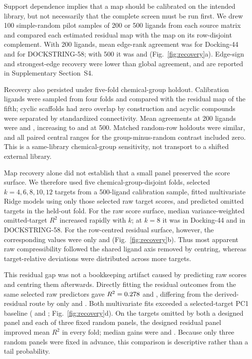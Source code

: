 \documentclass[11pt]{article}
\begin{document}
Support dependence implies that a map should be calibrated on the intended
library, but not necessarily that the complete screen must be run first. We drew
100 simple-random pilot samples of 200 or 500 ligands from each source matrix and
compared each estimated residual map with the map on its row-disjoint complement.
With 200 ligands, mean edge-rank agreement was \DffProbeTwoHundred{} for
Docking-44 and \DsProbeTwoHundred{} for DOCKSTRING-58; with 500 it was
\DffProbeFiveHundred{} and \DsProbeFiveHundred{}
(Fig.~\ref{fig:recovery}a). Edge-sign and strongest-edge recovery were lower
than global agreement, and are reported in Supplementary Section~S4.

Recovery also persisted under five-fold chemical-group holdout. Calibration
ligands were sampled from four folds and compared with the residual map of the
fifth; cyclic scaffolds had zero overlap by construction and acyclic compounds
were separated by standardized connectivity. Mean agreements at 200 ligands
were \DffScaffoldProbeTwoHundred{} and \DsScaffoldProbeTwoHundred{}, increasing
to \DffScaffoldProbeFiveHundred{} and \DsScaffoldProbeFiveHundred{} at 500.
Matched random-row holdouts were similar, and all paired central ranges for the
group-minus-random contrast included zero. This is a same-library
chemical-group sensitivity, not transport to a shifted external library.

Map recovery alone did not establish that a small panel preserved the score
surface. We therefore used five chemical-group-disjoint folds, selected
$k=4,6,8,10,12$ targets from a 500-ligand calibration sample, fitted
multivariate Ridge models using only those selected raw target scores, and
predicted omitted targets in the held-out fold. For the raw score surface,
median variance-weighted omitted-target $R^2$ increased rapidly with $k$; at
$k=8$ it was \DffSelectorRawRtwo{} in Docking-44 and \DsSelectorRawRtwo{} in
DOCKSTRING-58. For the row-centred residual surface, however, the corresponding
values were only \DffSelectorResidualRtwo{} and
\DsSelectorResidualRtwo{} (Fig.~\ref{fig:recovery}b). Thus most apparent raw
compressibility followed the shared ligand axis removed by centring, whereas
target-relative deviations were distributed across more targets.

This residual gap was not a bookkeeping artifact caused by predicting raw
scores and centring them afterwards. Directly fitting the residual outcomes
from the same selected raw predictors gave $R^2=0.278{}$
and \DsSelectorDirectResidualRtwo{}, differing from the derived-residual route
by only \DffSelectorDirectResidualDelta{} and
\DsSelectorDirectResidualDelta{}. Both multivariate fits exceeded a
selected-target PC1 baseline (\DffSelectorResidualPCOneRtwo{} and
\DsSelectorResidualPCOneRtwo{}; Fig.~\ref{fig:recovery}d). On the targets
omitted by both a designed panel and each of three fixed random panels, the
designed residual panel improved mean $R^2$ in every fold; median gains were
\DffSelectorCommonResidualDelta{} and \DsSelectorCommonResidualDelta{}.
Because only three random panels were fixed in advance, this comparison is
descriptive rather than a tail probability.
\end{document}
